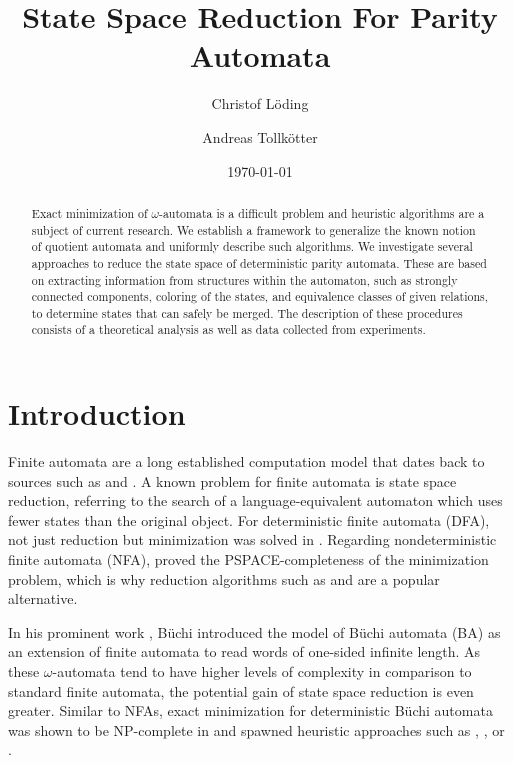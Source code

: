 

\title{State Space Reduction For Parity Automata}
\author{Christof Löding \and Andreas Tollkötter}
\date{\today}

\maketitle





\begin{abstract}
	Exact minimization of $\omega$-automata is a difficult problem and heuristic algorithms are a subject of current research. We establish a framework to generalize the known notion of quotient automata and uniformly describe such algorithms. We investigate several approaches to reduce the state space of deterministic parity automata. These are based on extracting information from structures within the automaton, such as strongly connected components, coloring of the states, and equivalence classes of given relations, to determine states that can safely be merged. The description of these procedures consists of a theoretical analysis as well as data collected from experiments. 
\end{abstract}


\section{Introduction}

Finite automata are a long established computation model that dates back to sources such as \cite{McCulloch1990} and \cite{RabinScott1959}. A known problem for finite automata is state space reduction, referring to the search of a language-equivalent automaton which uses fewer states than the original object. For deterministic finite automata (DFA), not just reduction but minimization was solved in \cite{Hopcroft1971}. Regarding nondeterministic finite automata (NFA), \cite{JianRavikumar1991} proved the PSPACE-completeness of the minimization problem, which is why reduction algorithms such as \cite{ChamparnaudCoulon2004} and \cite{BonchiPous2013} are a popular alternative.

In his prominent work \cite{Buchi1966}, B\"uchi introduced the model of B\"uchi automata (BA) as an extension of finite automata to read words of one-sided infinite length. As these $\omega$-automata tend to have higher levels of complexity in comparison to standard finite automata, the potential gain of state space reduction is even greater. Similar to NFAs, exact minimization for deterministic B\"uchi automata was shown to be NP-complete in \cite{Schewe2010} and spawned heuristic approaches such as \cite{Schewe2010}, \cite{MayrClemente2012}, or \cite{EtessamiWilkeSchuller2001}. 

